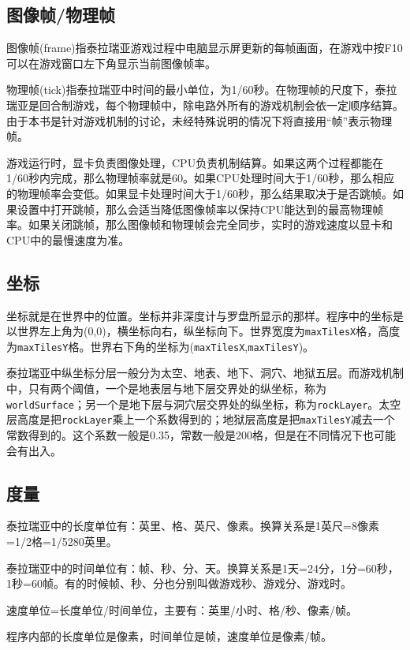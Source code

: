 \subsection{图像帧/物理帧}

图像帧(frame)指泰拉瑞亚游戏过程中电脑显示屏更新的每帧画面，在游戏中按F10可以在游戏窗口左下角显示当前图像帧率。

物理帧(tick)指泰拉瑞亚中时间的最小单位，为1/60秒。在物理帧的尺度下，泰拉瑞亚是回合制游戏，每个物理帧中，除电路外所有的游戏机制会依一定顺序结算。由于本书是针对游戏机制的讨论，未经特殊说明的情况下将直接用“帧”表示物理帧。

游戏运行时，显卡负责图像处理，CPU负责机制结算。如果这两个过程都能在1/60秒内完成，那么物理帧率就是60。如果CPU处理时间大于1/60秒，那么相应的物理帧率会变低。如果显卡处理时间大于1/60秒，那么结果取决于是否跳帧。如果设置中打开跳帧，那么会适当降低图像帧率以保持CPU能达到的最高物理帧率。如果关闭跳帧，那么图像帧和物理帧会完全同步，实时的游戏速度以显卡和CPU中的最慢速度为准。

\subsection{坐标}\label{tab8}
坐标就是在世界中的位置。坐标并非深度计与罗盘所显示的那样。程序中的坐标是以世界左上角为(0,0)，横坐标向右，纵坐标向下。世界宽度为\lstinline{maxTilesX}格，高度为\lstinline{maxTilesY}格。世界右下角的坐标为(\lstinline{maxTilesX},\lstinline{maxTilesY})。

泰拉瑞亚中纵坐标分层一般分为太空、地表、地下、洞穴、地狱五层。而游戏机制中，只有两个阈值，一个是地表层与地下层交界处的纵坐标，称为\lstinline{worldSurface}；另一个是地下层与洞穴层交界处的纵坐标，称为\lstinline{rockLayer}。太空层高度是把\lstinline{rockLayer}乘上一个系数得到的；地狱层高度是把\lstinline{maxTilesY}减去一个常数得到的。这个系数一般是0.35，常数一般是200格，但是在不同情况下也可能会有出入。

\subsection{度量}
泰拉瑞亚中的长度单位有：英里、格、英尺、像素。换算关系是1英尺=8像素=1/2格=1/5280英里。

泰拉瑞亚中的时间单位有：帧、秒、分、天。换算关系是1天=24分，1分=60秒，1秒=60帧。有的时候帧、秒、分也分别叫做游戏秒、游戏分、游戏时。

速度单位=长度单位/时间单位，主要有：英里/小时、格/秒、像素/帧。

程序内部的长度单位是像素，时间单位是帧，速度单位是像素/帧。

